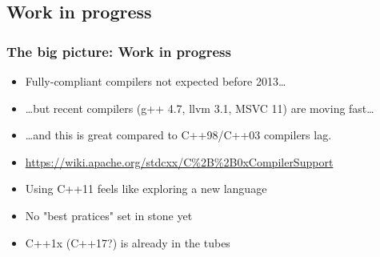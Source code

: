 \documentclass[xcolor=dvipsnames]{beamer}
\begin{document}
\subsection{Work in progress}
\begin{frame}[fragile]
\frametitle{The big picture: Work in progress}

\begin{itemize}
  \item Fully-compliant compilers not expected before 2013\ldots
  \pause
  \item \ldots but recent compilers (g++ 4.7, llvm 3.1, MSVC 11) are moving fast\ldots
  \pause
  \item \ldots and this is great compared to C++98/C++03 compilers lag.
  \pause
  \item {\footnotesize \url{https://wiki.apache.org/stdcxx/C%2B%2B0xCompilerSupport}}
\end{itemize}

\pause

\begin{itemize}
  \item Using C++11 feels like exploring a new language
  \pause
  \item No "best pratices" set in stone yet
  \pause
  \item C++1x (C++17?) is already in the tubes
\end{itemize}
\end{frame}
\end{document}
